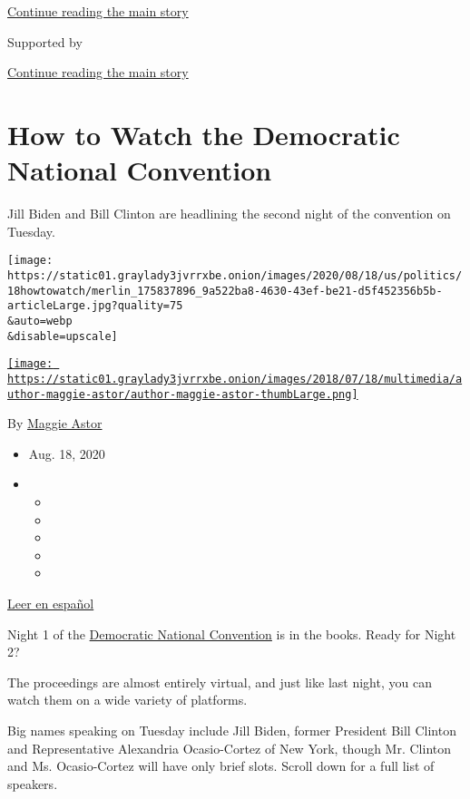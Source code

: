 \protect\hyperlink{after-top}{Continue reading the main story}

Supported by

\protect\hyperlink{after-sponsor}{Continue reading the main story}

\hypertarget{how-to-watch-the-democratic-national-convention}{%
\section{How to Watch the Democratic National
Convention}\label{how-to-watch-the-democratic-national-convention}}

Jill Biden and Bill Clinton are headlining the second night of the
convention on Tuesday.

\texttt{[image: https://static01.graylady3jvrrxbe.onion/images/2020/08/18/us/politics/18howtowatch/merlin\_175837896\_9a522ba8-4630-43ef-be21-d5f452356b5b-articleLarge.jpg?quality=75\\\&auto=webp\\\&disable=upscale]}

\href{https://www.nytimes3xbfgragh.onion/by/maggie-astor}{\texttt{[image: https://static01.graylady3jvrrxbe.onion/images/2018/07/18/multimedia/author-maggie-astor/author-maggie-astor-thumbLarge.png]}}

By \href{https://www.nytimes3xbfgragh.onion/by/maggie-astor}{Maggie
Astor}

\begin{itemize}
\item
  Aug. 18, 2020
\item
  \begin{itemize}
  \item
  \item
  \item
  \item
  \item
  \end{itemize}
\end{itemize}

\href{https://www.nytimes3xbfgragh.onion/es/2020/08/18/espanol/estados-unidos/horario-cnd-convencion-democrata.html}{Leer
en español}

Night 1 of the
\href{https://www.nytimes3xbfgragh.onion/article/dnc-2020.html}{Democratic
National Convention} is in the books. Ready for Night 2?

The proceedings are almost entirely virtual, and just like last night,
you can watch them on a wide variety of platforms.

Big names speaking on Tuesday include Jill Biden, former President Bill
Clinton and Representative Alexandria Ocasio-Cortez of New York, though
Mr. Clinton and Ms. Ocasio-Cortez will have only brief slots. Scroll
down for a full list of speakers.

